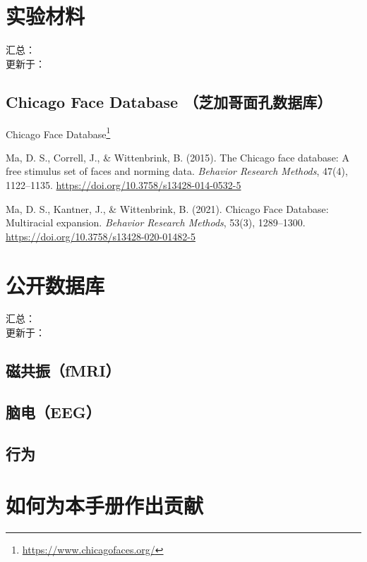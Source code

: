 \documentclass[]{ctexbook}
\renewcommand{\href}[2]{#2\footnote{\url{#1}}}
\theoremstyle{definition}
\theoremstyle{definition}
\theoremstyle{definition}
\theoremstyle{definition}
\theoremstyle{remark}
\begin{document}
\chapter{实验材料}\label{materials}

汇总：\\
更新于：

\section{Chicago Face Database （芝加哥面孔数据库）}\label{chicago-face-database-ux829dux52a0ux54e5ux9762ux5b54ux6570ux636eux5e93}

\href{https://www.chicagofaces.org/}{Chicago Face Database}

Ma, D. S., Correll, J., \& Wittenbrink, B. (2015). The Chicago face database: A free stimulus set of faces and norming data. \emph{Behavior Research Methods}, 47(4), 1122--1135. \url{https://doi.org/10.3758/s13428-014-0532-5}

Ma, D. S., Kantner, J., \& Wittenbrink, B. (2021). Chicago Face Database: Multiracial expansion. \emph{Behavior Research Methods}, 53(3), 1289--1300. \url{https://doi.org/10.3758/s13428-020-01482-5}

\chapter{公开数据库}\label{opendata}

汇总：\\
更新于：

\section{磁共振（fMRI）}\label{ux78c1ux5171ux632ffmri}

\section{脑电（EEG）}\label{ux8111ux7535eeg}

\section{行为}\label{ux884cux4e3a}

\cleardoublepage

\appendix {}


\chapter{如何为本手册作出贡献}\label{contribute}
\end{document}
